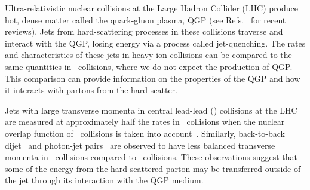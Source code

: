 
Ultra-relativistic nuclear collisions at the Large Hadron Collider (LHC) produce hot, dense matter
called the quark-gluon plasma, QGP (see Refs.~\cite{Roland:2014jsa,Busza:2018rrf} for recent reviews).
Jets from hard-scattering processes in these collisions 
traverse and interact with the QGP, losing energy via a process called jet-quenching. The rates and characteristics of these jets in heavy-ion collisions can be compared to the same quantities in \pp\ collisions, where we do not expect the production of QGP. This comparison can provide information on the properties of the QGP and how it interacts with partons from the hard scatter.

Jets with large transverse momenta in central lead-lead (\pbpb) collisions at the LHC are measured at approximately half the rates in \pp\ collisions when the nuclear overlap function of \pbpb\ collisions is taken into account~\cite{Abelev:2013kqa,Aad:2014bxa,Adam:2015ewa,Khachatryan:2016jfl, 2019108}. 
Similarly, back-to-back dijet~\cite{Aad:2010bu,Chatrchyan:2011sx,Aaboud:2017eww} 
and photon-jet pairs~\cite{Chatrchyan:2012gt,Aaboud:2018anc} are observed to have
less balanced transverse momenta in \pbpb\ collisions compared to \pp\ collisions.
These observations suggest that some of the energy from the hard-scattered parton may be
transferred outside of the jet through its interaction with the QGP medium.  

